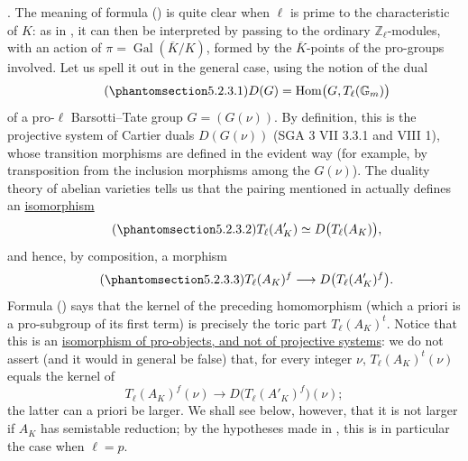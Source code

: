 \smallskip
\noindent
{}. The meaning of formula () is quite clear when $\ell$ is
prime to the characteristic of $K$: as in , it can then be
interpreted by passing to the ordinary $\mathbb Z_\ell$-modules, with
an action of
$\pi=\operatorname{Gal}(\overline K/K)$, formed by the
$\overline K$-points of the pro-groups involved.  Let us spell it out
in the general case, using the notion of the dual
\begin{equation}\tag{\SGARefTarget{sga7.sga7i.eix.n5-2-3-1}{5.2.3.1}}
 D(G)=\operatorname{Hom}\bigl(G,T_\ell(\mathbb G_m)\bigr)
\end{equation}
of a pro-$\ell$ Barsotti--Tate group $G=(G(\nu))$.  By definition,
this is the projective system of Cartier duals $D(G(\nu))$
(SGA 3 VII 3.3.1 and VIII 1), whose transition morphisms are defined in
the evident way (for example, by transposition from the inclusion
morphisms among the $G(\nu)$).  The duality theory of abelian
varieties tells us that the pairing mentioned in  actually defines
an \underline{isomorphism}
\begin{equation}\tag{\SGARefTarget{sga7.sga7i.eix.n5-2-3-2}{5.2.3.2}}
 T_\ell(A'_K)\simeq D\bigl(T_\ell(A_K)\bigr),
\end{equation}
and hence, by composition, a morphism
\begin{equation}\tag{\SGARefTarget{sga7.sga7i.eix.n5-2-3-3}{5.2.3.3}}
 T_\ell(A_K)^f\longrightarrow D\bigl(T_\ell(A'_K)^f\bigr).
\end{equation}
Formula () says that the kernel of the preceding homomorphism
(which a priori is a pro-subgroup of its first term) is precisely the
toric part $T_\ell(A_K)^t$.  Notice that this is an
\underline{isomorphism of pro-objects, and not of projective systems}:
we do not assert (and it would in general be false) that, for every
integer $\nu$, $T_\ell(A_K)^t(\nu)$ equals the kernel of
\[
 T_\ell(A_K)^f(\nu)
 \longrightarrow
 D\bigl(T_\ell(A'_K)^f\bigr)(\nu);
\]
the latter can a priori be larger.  We shall see below, however, that
it is not larger if $A_K$ has semistable reduction; by the hypotheses
made in , this is in particular the case when $\ell=p$.

